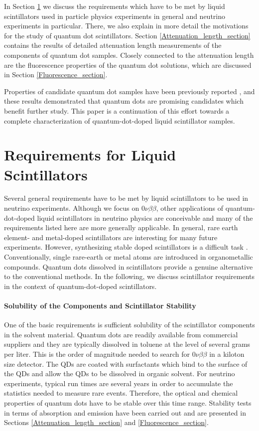 \documentclass[cits]{JINST}
\begin{document}
In Section \ref{Requirements_section} we discuss the requirements which have to be met by liquid scintillators used in particle physics experiments in general and neutrino experiments in particular. There, we also explain in more detail the motivations for the study of quantum dot scintillators. Section \ref{Attenuation_length_section} contains the results of detailed attenuation length measurements of the components of quantum dot samples. Closely connected to the attenuation length are the fluorescence properties of the quantum dot solutions, which are discussed in Section \ref{Fluorescence_section}. 

Properties of candidate quantum dot samples have been previously reported \cite{mitpaper}, and these results demonstrated that quantum dots are promising candidates which benefit further study. This paper is a continuation of this effort towards a complete characterization of quantum-dot-doped liquid scintillator samples. 


\section{Requirements for Liquid Scintillators}\label{Requirements_section}
Several general requirements have to be met by liquid scintillators to be used in neutrino experiments. Although we focus on 0$\nu\beta\beta$, other applications of quantum-dot-doped liquid scintillators in neutrino physics are conceivable \cite{mitpaper} and many of the requirements listed here are more generally applicable. In general, rare earth element- and metal-doped scintillators are interesting for many future experiments. However, synthesizing stable doped scintillators is a difficult task \cite{gd_mpik,chooz,piepke}. Conventionally, single rare-earth or metal atoms are introduced in organometallic compounds. Quantum dots dissolved in scintillators provide a genuine alternative to the conventional methods. In the following, we discuss scintillator requirements in the context of quantum-dot-doped scintillators.  

\paragraph{Solubility of the Components and Scintillator Stability}
One of the basic requirements is sufficient solubility of the scintillator components in the solvent material. Quantum dots are readily available from commercial suppliers and they are typically dissolved in toluene at the level of several grams per liter. This is the order of magnitude needed to search for 0$\nu\beta\beta$ in a kiloton size detector. The QDs are coated with surfactants which bind to the surface of the QDs and allow the QDs to be dissolved in organic solvent. For neutrino experiments, typical run times are several years in order to accumulate the statistics needed to measure rare events. Therefore, the optical and chemical properties of quantum dots have to be stable over this time range. Stability tests in terms of absorption and emission have been carried out and are presented in Sections \ref{Attenuation_length_section} and \ref{Fluorescence_section}.
\end{document}
